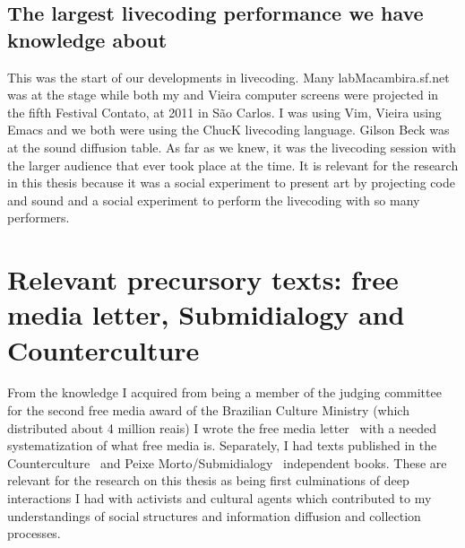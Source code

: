 \begin{apendicesenv}
\subsection{The largest livecoding performance we have knowledge about}
This was the start of our developments in livecoding.
Many labMacambira.sf.net was at the stage while both my and Vieira computer screens
were projected in the fifth Festival Contato, at 2011 in São Carlos.
I was using Vim, Vieira using Emacs and we both were using the ChucK
livecoding language.
Gilson Beck was at the sound diffusion table.
As far as we knew, it was the livecoding session with the larger audience
that ever took place at the time.
It is relevant for the research in this thesis because it was
a social experiment to present art by projecting code and sound
and a social experiment to perform the livecoding with so many performers.

\section{Relevant precursory texts: free media letter, Submidialogy and Counterculture}
From the knowledge I acquired from being a member of the judging committee for the second
free media award of the Brazilian Culture Ministry (which distributed about 4 million reais)
I wrote the free media letter~\cite{cartaML} with a needed systematization of what free media is.
Separately, I had texts published in the Counterculture~\cite{ccd} and Peixe Morto/Submidialogy~\cite{subMid} independent books.
These are relevant for the research on this thesis as being first culminations of deep interactions
I had with activists and cultural agents which contributed to my understandings of social structures
and information diffusion and collection processes.

\end{apendicesenv}
